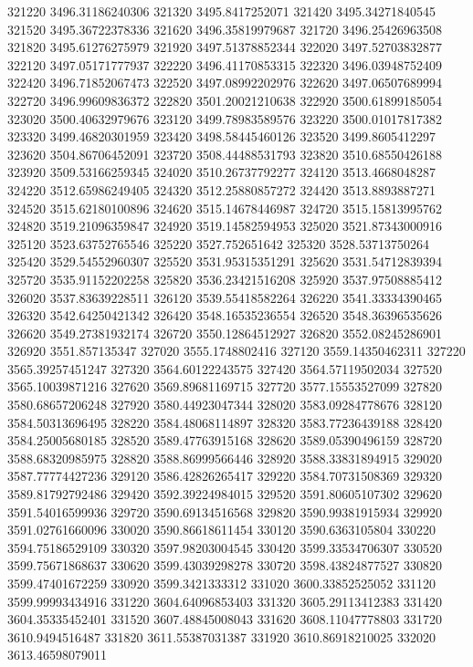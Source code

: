 {321220 3496.31186240306
321320 3495.8417252071
321420 3495.34271840545
321520 3495.36722378336
321620 3496.35819979687
321720 3496.25426963508
321820 3495.61276275979
321920 3497.51378852344
322020 3497.52703832877
322120 3497.05171777937
322220 3496.41170853315
322320 3496.03948752409
322420 3496.71852067473
322520 3497.08992202976
322620 3497.06507689994
322720 3496.99609836372
322820 3501.20021210638
322920 3500.61899185054
323020 3500.40632979676
323120 3499.78983589576
323220 3500.01017817382
323320 3499.46820301959
323420 3498.58445460126
323520 3499.8605412297
323620 3504.86706452091
323720 3508.44488531793
323820 3510.68550426188
323920 3509.53166259345
324020 3510.26737792277
324120 3513.4668048287
324220 3512.65986249405
324320 3512.25880857272
324420 3513.8893887271
324520 3515.62180100896
324620 3515.14678446987
324720 3515.15813995762
324820 3519.21096359847
324920 3519.14582594953
325020 3521.87343000916
325120 3523.63752765546
325220 3527.752651642
325320 3528.53713750264
325420 3529.54552960307
325520 3531.95315351291
325620 3531.54712839394
325720 3535.91152202258
325820 3536.23421516208
325920 3537.97508885412
326020 3537.83639228511
326120 3539.55418582264
326220 3541.33334390465
326320 3542.64250421342
326420 3548.16535236554
326520 3548.36396535626
326620 3549.27381932174
326720 3550.12864512927
326820 3552.08245286901
326920 3551.857135347
327020 3555.1748802416
327120 3559.14350462311
327220 3565.39257451247
327320 3564.60122243575
327420 3564.57119502034
327520 3565.10039871216
327620 3569.89681169715
327720 3577.15553527099
327820 3580.68657206248
327920 3580.44923047344
328020 3583.09284778676
328120 3584.50313696495
328220 3584.48068114897
328320 3583.77236439188
328420 3584.25005680185
328520 3589.47763915168
328620 3589.05390496159
328720 3588.68320985975
328820 3588.86999566446
328920 3588.33831894915
329020 3587.77774427236
329120 3586.42826265417
329220 3584.70731508369
329320 3589.81792792486
329420 3592.39224984015
329520 3591.80605107302
329620 3591.54016599936
329720 3590.69134516568
329820 3590.99381915934
329920 3591.02761660096
330020 3590.86618611454
330120 3590.6363105804
330220 3594.75186529109
330320 3597.98203004545
330420 3599.33534706307
330520 3599.75671868637
330620 3599.43039298278
330720 3598.43824877527
330820 3599.47401672259
330920 3599.3421333312
331020 3600.33852525052
331120 3599.99993434916
331220 3604.64096853403
331320 3605.29113412383
331420 3604.35335452401
331520 3607.48845008043
331620 3608.11047778803
331720 3610.9494516487
331820 3611.55387031387
331920 3610.86918210025
332020 3613.46598079011
}
